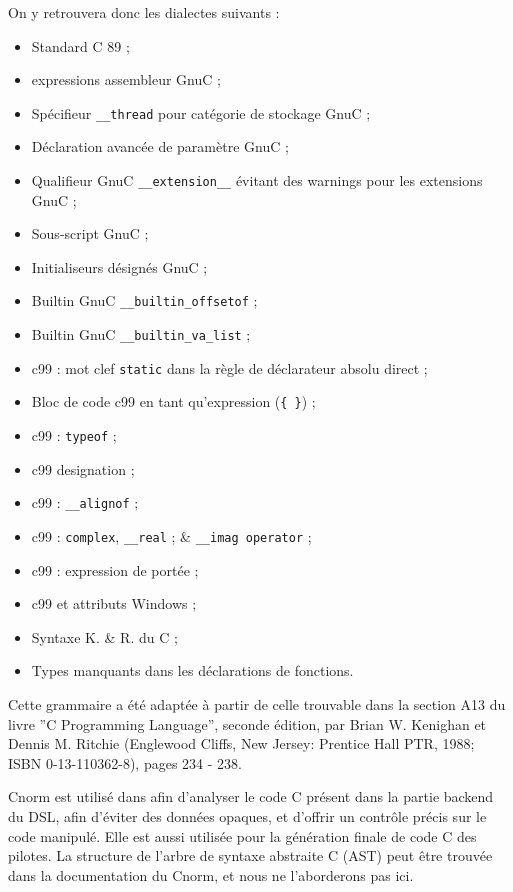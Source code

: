 \documentclass[french]{rtxreport}
\begin{document}
On y retrouvera donc les dialectes suivants :
\begin{itemize}
    \item Standard C 89 ;
    \item expressions assembleur GnuC ;
    \item Spécifieur \texttt{\_\_thread} pour catégorie de stockage GnuC ;
    \item Déclaration avancée de paramètre GnuC ;
    \item Qualifieur GnuC \texttt{\_\_extension\_\_} évitant des warnings pour
            les extensions GnuC ;
    \item Sous-script GnuC ;
    \item Initialiseurs désignés GnuC ;
    \item Builtin GnuC \texttt{\_\_builtin\_offsetof} ;
    \item Builtin GnuC \texttt{\_\_builtin\_va\_list} ;
    \item c99 : mot clef \texttt{static} dans la règle de déclarateur
                absolu direct ;
    \item Bloc de code c99 en tant qu'expression (\texttt{\{ \}}) ;
    \item c99 : \texttt{typeof} ;
    \item c99 designation ;
    \item c99 : \texttt{\_\_alignof} ;
    \item c99 : \texttt{complex}, \texttt{\_\_real} ;
                \& \texttt{\_\_imag operator} ;
    \item c99 : expression de portée ; %
    \item c99 et attributs Windows ;
    \item Syntaxe K. \& R. du C ;
    \item Types manquants dans les déclarations de fonctions.
\end{itemize}

Cette grammaire a été adaptée à partir de celle trouvable dans la section A13
du livre ''C Programming Language'', seconde édition, par Brian W. Kenighan et
Dennis M. Ritchie (Englewood Cliffs, New Jersey: Prentice Hall PTR, 1988; ISBN
0-13-110362-8), pages 234 - 238. 

Cnorm est utilisé dans \rtx afin d'analyser le code C présent dans la partie
backend du DSL, afin d'éviter des données opaques, et d'offrir un contrôle
précis sur le code manipulé. Elle est aussi utilisée pour la génération finale
de code C des pilotes. La structure de l'arbre de syntaxe abstraite C (AST) peut
être trouvée dans la documentation du Cnorm, et nous ne l'aborderons pas ici.
\end{document}
